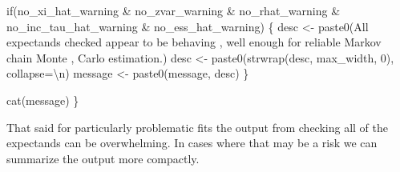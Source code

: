 \documentclass[
  letterpaper,
  DIV=11,
  numbers=noendperiod]{scrartcl}
\newenvironment{Shaded}{\begin{snugshade}}{\end{snugshade}}
\newcommand{\CharTok}[1]{\textcolor[rgb]{0.13,0.47,0.30}{#1}}
\newcommand{\ControlFlowTok}[1]{\textcolor[rgb]{0.00,0.23,0.31}{#1}}
\newcommand{\DecValTok}[1]{\textcolor[rgb]{0.68,0.00,0.00}{#1}}
\newcommand{\NormalTok}[1]{\textcolor[rgb]{0.00,0.23,0.31}{#1}}
\newcommand{\OperatorTok}[1]{\textcolor[rgb]{0.37,0.37,0.37}{#1}}
\newcommand{\StringTok}[1]{\textcolor[rgb]{0.13,0.47,0.30}{#1}}
\begin{document}
\begin{Shaded}
\begin{Highlighting}[]
  \ControlFlowTok{if}\NormalTok{(no\_xi\_hat\_warning }\OperatorTok{\&}\NormalTok{ no\_zvar\_warning }\OperatorTok{\&} 
\NormalTok{     no\_rhat\_warning }\OperatorTok{\&}\NormalTok{ no\_inc\_tau\_hat\_warning }\OperatorTok{\&}\NormalTok{ no\_ess\_hat\_warning) \{}
\NormalTok{    desc }\OperatorTok{\textless{}{-}}\NormalTok{ paste0(}\StringTok{\textquotesingle{}All expectands checked appear to be behaving \textquotesingle{}}\NormalTok{,}
                   \StringTok{\textquotesingle{}well enough for reliable Markov chain Monte \textquotesingle{}}\NormalTok{,}
                   \StringTok{\textquotesingle{}Carlo estimation.\textquotesingle{}}\NormalTok{)}
\NormalTok{    desc }\OperatorTok{\textless{}{-}}\NormalTok{ paste0(strwrap(desc, max\_width, }\DecValTok{0}\NormalTok{), collapse}\OperatorTok{=}\StringTok{\textquotesingle{}}\CharTok{\textbackslash{}n}\StringTok{\textquotesingle{}}\NormalTok{)}
\NormalTok{    message }\OperatorTok{\textless{}{-}}\NormalTok{ paste0(message, desc)}
\NormalTok{  \}}

\NormalTok{  cat(message)}
\NormalTok{\}}
\end{Highlighting}
\end{Shaded}

That said for particularly problematic fits the output from checking all
of the expectands can be overwhelming. In cases where that may be a risk
we can summarize the output more compactly.
\end{document}
